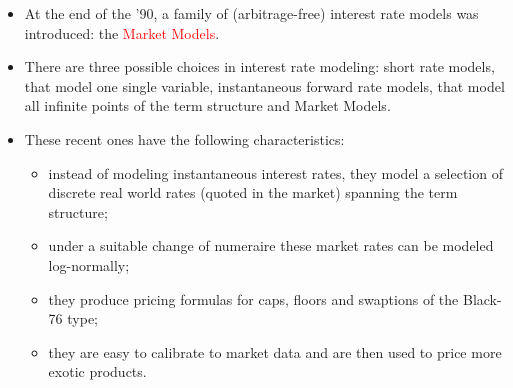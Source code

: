 \documentclass{beamer}
\begin{document}
\begin{frame}
	\begin{itemize}
		\item At the end of the ’90, a family of (arbitrage-free) interest rate models was introduced: the \textcolor{red}{Market Models}. %
		\item There are three possible choices in interest rate modeling: short rate models, that model one single variable, instantaneous forward rate models, that model all infinite points of the term structure and Market Models.
		\item These recent ones have the following characteristics:
		\begin{itemize}
		\item instead of modeling instantaneous interest rates, they model a selection of discrete real world rates (quoted in the market) spanning the term structure;
		\item under a suitable change of numeraire these market rates can be modeled log-normally;
		\item they produce pricing formulas for caps, floors and swaptions of the Black-76 type;
		\item they are easy to calibrate to market data and are then used to price more exotic products.
	\end{itemize}
\end{itemize}
\end{frame}
\end{document}
